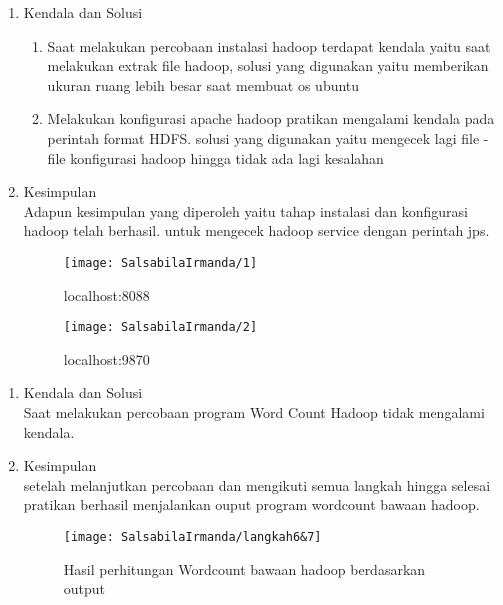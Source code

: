 
\begin{enumerate}
\item Kendala dan Solusi\\
\begin{enumerate}
\item Saat melakukan percobaan instalasi hadoop terdapat kendala yaitu saat melakukan extrak file hadoop, solusi yang digunakan yaitu memberikan ukuran ruang lebih besar saat membuat os ubuntu
\item Melakukan konfigurasi apache hadoop pratikan mengalami kendala pada perintah format HDFS. solusi yang digunakan yaitu mengecek lagi file - file konfigurasi hadoop hingga tidak ada lagi kesalahan
\end{enumerate}

\item Kesimpulan \\
Adapun kesimpulan yang diperoleh yaitu tahap instalasi dan konfigurasi hadoop telah berhasil. untuk mengecek hadoop service dengan perintah jps.
\begin{figure}[!ht]
\texttt{[image: SalsabilaIrmanda/1]}
\caption{localhost:8088}
\label{gam:perkuliahan-22-09}
\end{figure}

\newpage
\begin{figure}[!ht]
\texttt{[image: SalsabilaIrmanda/2]}
\caption{localhost:9870}
\label{gam:perkuliahan-22-09}
\end{figure}
\end{enumerate}


\begin{enumerate}
\item Kendala dan Solusi \\
Saat melakukan percobaan program Word Count Hadoop tidak mengalami kendala. 
\item Kesimpulan \\
setelah melanjutkan percobaan dan mengikuti semua langkah hingga selesai pratikan berhasil menjalankan ouput program wordcount bawaan hadoop. 

\begin{figure}[!ht]
\texttt{[image: SalsabilaIrmanda/langkah6\&7]}
\caption{Hasil perhitungan Wordcount bawaan hadoop berdasarkan output}
\label{gam:perkuliahan-08-12}
\end{figure}
\end{enumerate}

